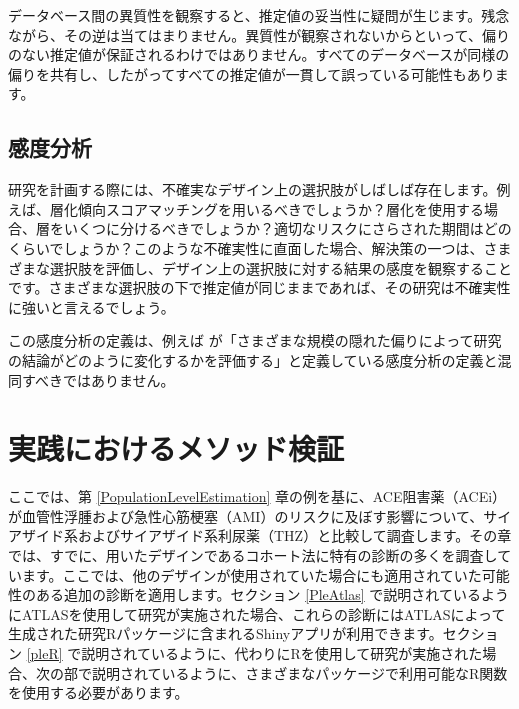 \documentclass[
  11pt]{book}
\makeatletter
\newenvironment{kframe}{%
\medskip{}
\setlength{\fboxsep}{.8em}
 \def\at@end@of@kframe{}%
 \ifinner\ifhmode%
  \def\at@end@of@kframe{\end{minipage}}%
  \begin{minipage}{\columnwidth}%
 \fi\fi%
 \def\FrameCommand##1{\hskip\@totalleftmargin \hskip-\fboxsep
 \colorbox{myShadeColor}{##1}\hskip-\fboxsep
     \hskip-\linewidth \hskip-\@totalleftmargin \hskip\columnwidth}%
 \MakeFramed {\advance\hsize-\width
   \@totalleftmargin\z@ \linewidth\hsize
   \@setminipage}}%
 {\par\unskip\endMakeFramed%
 \at@end@of@kframe}
\newenvironment{rmdblock}[1]
  {
  \begin{itemize}
  \renewcommand{\labelitemi}{
    \raisebox{-.7\height}[0pt][0pt]{
      {\setkeys{Gin}{width=3em,keepaspectratio}\texttt{[image: images/\#1]}}
    }
  }
  \setlength{\fboxsep}{1em}
  \begin{kframe}
  \item
  }
  {
  \end{kframe}
  \end{itemize}
  }
\newenvironment{rmdimportant}
  {\begin{rmdblock}{important}}
  {\end{rmdblock}}
\theoremstyle{definition}
\theoremstyle{definition}
\theoremstyle{definition}
\theoremstyle{definition}
\theoremstyle{remark}
\makeatother
\begin{document}
\begin{rmdimportant}
データベース間の異質性を観察すると、推定値の妥当性に疑問が生じます。残念ながら、その逆は当てはまりません。異質性が観察されないからといって、偏りのない推定値が保証されるわけではありません。すべてのデータベースが同様の偏りを共有し、したがってすべての推定値が一貫して誤っている可能性もあります。
\end{rmdimportant}

\subsection{感度分析}\label{ux611fux5ea6ux5206ux6790}


研究を計画する際には、不確実なデザイン上の選択肢がしばしば存在します。例えば、層化傾向スコアマッチングを用いるべきでしょうか？層化を使用する場合、層をいくつに分けるべきでしょうか？適切なリスクにさらされた期間はどのくらいでしょうか？このような不確実性に直面した場合、解決策の一つは、さまざまな選択肢を評価し、デザイン上の選択肢に対する結果の感度を観察することです。さまざまな選択肢の下で推定値が同じままであれば、その研究は不確実性に強いと言えるでしょう。

この感度分析の定義は、例えば \citet{rosenbaum_2005} が「さまざまな規模の隠れた偏りによって研究の結論がどのように変化するかを評価する」と定義している感度分析の定義と混同すべきではありません。

\section{実践におけるメソッド検証}\label{ux5b9fux8df5ux306bux304aux3051ux308bux30e1ux30bdux30c3ux30c9ux691cux8a3c}

ここでは、第 \ref{PopulationLevelEstimation} 章の例を基に、ACE阻害薬（ACEi）が血管性浮腫および急性心筋梗塞（AMI）のリスクに及ぼす影響について、サイアザイド系およびサイアザイド系利尿薬（THZ）と比較して調査します。その章では、すでに、用いたデザインであるコホート法に特有の診断の多くを調査しています。ここでは、他のデザインが使用されていた場合にも適用されていた可能性のある追加の診断を適用します。セクション \ref{PleAtlas} で説明されているようにATLASを使用して研究が実施された場合、これらの診断にはATLASによって生成された研究Rパッケージに含まれるShinyアプリが利用できます。セクション \ref{pleR} で説明されているように、代わりにRを使用して研究が実施された場合、次の部で説明されているように、さまざまなパッケージで利用可能なR関数を使用する必要があります。
\end{document}
